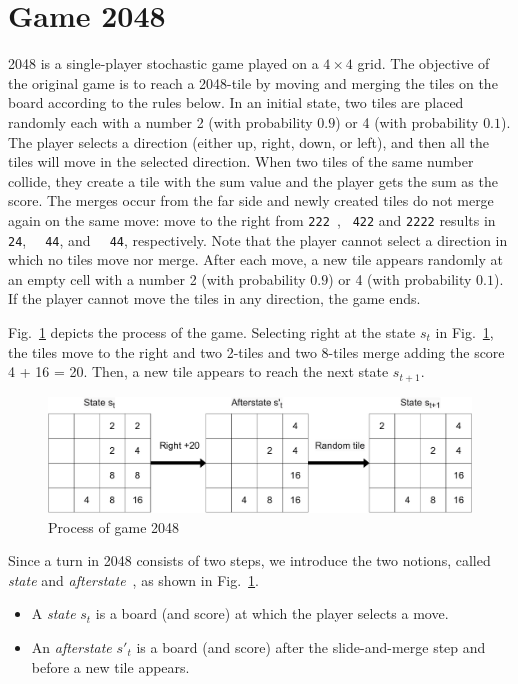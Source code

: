 \section{Game 2048}

2048 is a single-player stochastic game played on a $4 \times 4$ grid.
The objective of the original game is to reach a 2048-tile by moving and merging
the tiles on the board according to the rules below.
In an initial state, two tiles are placed randomly each with a number 2 (with probability $0.9$) or 4 (with probability $0.1$).
The player selects a direction (either up, right, down, or left), and then all the tiles will move in the selected direction.
When two tiles of the same number collide, they create a tile with the sum value and the player gets the sum as the score.
The merges occur from the far side and newly created tiles do not merge again on the same move: move to the right from \verb*|222 |, \verb*| 422| and \verb*|2222| results in
\verb*|  24|, \verb*|  44|, and \verb*|  44|, respectively.
Note that the player cannot select a direction in which no tiles move nor merge.
After each move, a new tile appears randomly at an empty cell with a number 2 (with probability $0.9$) or 4 (with probability $0.1$).
If the player cannot move the tiles in any direction, the game ends.

Fig.~\ref{fig:states-and-afterstates} depicts the process of the game.
Selecting right at the state $s_t$ in Fig.~\ref{fig:states-and-afterstates}, the tiles move to the right and
two 2-tiles and two 8-tiles merge adding the score 4 + 16 = 20.
Then, a new tile appears to reach the next state $s_{t+1}$.

\begin{figure}
  \centering\includegraphics[width=.8\linewidth]{figures/state_afterstate.pdf}
 \caption{Process of game 2048}
 \label{fig:states-and-afterstates}
\end{figure}

Since a turn in 2048 consists of two steps, we introduce the two notions, called \emph{state} and \emph{afterstate}~\cite{SzJa14}, as shown in Fig.~\ref{fig:states-and-afterstates}.
\begin{itemize}
 \item A \emph{state} $s_t$ is a board (and score) at which the player selects a move.
 \item An \emph{afterstate} $s'_t$ is a board (and score) after the slide-and-merge step and before a new tile appears.
\end{itemize}

